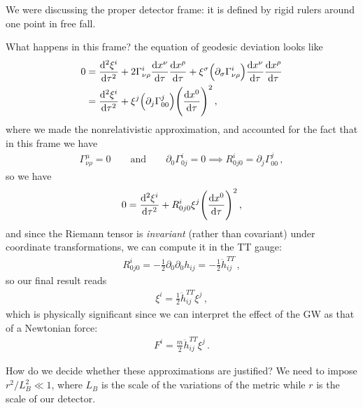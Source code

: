 \documentclass[main.tex]{subfiles}
\begin{document}

We were discussing the proper detector frame: it is defined by rigid rulers around one point in free fall. 

What happens in this frame? the equation of geodesic deviation looks like 
%
\begin{align}
0 &= \dv[2]{\xi^{i}}{\tau}
+ 2 \Gamma^{i}_{\nu \rho } \dv{x^{\nu }}{\tau } \dv{x^{\rho }}{\tau }
+ \xi^{\sigma } \qty( \partial_{\sigma } \Gamma^{i}_{\nu \rho } ) \dv{x^{\nu }}{\tau } \dv{x^{\rho }}{\tau }  \\
&=\dv[2]{\xi^{i}}{\tau}
+ \xi^{j} \qty(\partial_{j} \Gamma^{j}_{00}) \qty(\dv{x^{0}}{\tau })^2
\,,
\end{align}
%
where we made the nonrelativistic approximation, and accounted for the fact that in this frame we have  
%
\begin{align}
\Gamma^{\mu }_{\nu \rho } = 0
\qquad \text{and} \qquad
\partial_0 \Gamma^{i}_{0j} =0 
\implies 
R^{i}_{0j0} = \partial_{j} \Gamma^{j}_{00} 
\,,
\end{align}
%
so we have 
%
\begin{align}
0= \dv[2]{\xi^{i}}{\tau } + R^{i}_{0j0} \xi^{j} \qty(\dv{x^{0}}{\tau })^2
\,,
\end{align}
%
and since the Riemann tensor is \emph{invariant} (rather than covariant) under coordinate transformations, we can compute it in the TT gauge: 
%
\begin{align}
 R^{i}_{0j0} = - \frac{1}{2} \partial_0 \partial_0 h_{ij} = - \frac{1}{2} \ddot{h}_{ij}^{TT}
\,,
\end{align}
%
so our final result reads 
%
\begin{align}
\xi^{i} = \frac{1}{2} \ddot{h}^{TT}_{ij} \xi^{j}
\,,
\end{align}
%
which is physically significant since we can interpret the effect of the GW as that of a Newtonian force: 
%
\begin{align}
F^{i} = \frac{m}{2} \ddot{h}^{TT}_{ij} \xi^{j}
\,.
\end{align}

How do we decide whether these approximations are justified?
We need to impose \(r^2 / L_B^2 \ll 1 \), where \(L_B\) is the scale of the variations of the metric while \(r\) is the scale of our detector. 
\end{document}
